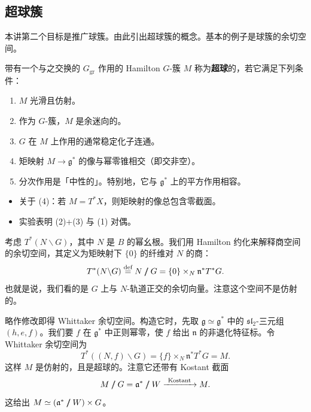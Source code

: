 \subsection{超球簇}

本讲第二个目标是推广球簇。由此引出超球簇的概念。基本的例子是球簇的余切空间。

\begin{defn}
带有一个与之交换的 $G_{\mathrm{gr}}$ 作用的 Hamilton $G$-簇 $M$ 称为\textbf{超球}的，若它满足下列条件：
\begin{enumerate}[label=(\arabic*),leftmargin=1.8em,itemsep=0.15em]
  \item $M$ 光滑且仿射。
  \item 作为 $G$-簇，$M$ 是余迷向的。
  \item $G$ 在 $M$ 上作用的通常稳定化子连通。
  \item 矩映射 $M\to\mathfrak g^*$ 的像与幂零锥相交（即交非空）。
  \item 分次作用是「中性的」。特别地，它与 $\mathfrak g^*$ 上的平方作用相容。
\end{enumerate}
\end{defn}

\begin{rem}\leavevmode\par
\begin{itemize}[leftmargin=1.4em]
  \item 关于 (4)：若 $M=T^*X$，则矩映射的像总包含零截面。
  \item 实验表明 (2)+(3) 与 (1) 对偶。
\end{itemize}
\end{rem}

\begin{exmp}
[$M$ 不是 $T^*X$ 形状的情形]
考虑 $T^*(N\backslash G)$，其中 $N$ 是 $B$ 的幂幺根。我们用 Hamilton 约化来解释商空间的余切空间，其定义为矩映射下 $\{0\}$ 的纤维对 $N$ 的商：
\[
  T^*(N\backslash G)\overset{\text{def}}{=}N\mathrel{/\mkern-10mu/} G=\{0\}\times_N\mathfrak n^*T^*G.
\]
也就是说，我们看的是 $G$ 上与 $N$-轨道正交的余切向量。注意这个空间不是仿射的。

略作修改即得 Whittaker 余切空间。构造它时，先取 $\mathfrak g\simeq\mathfrak g^*$ 中的 $\mathfrak{sl}_2$-三元组 $(h,e,f)$。我们要 $f$ 在 $\mathfrak g^*$ 中正则幂零，使 $f$ 给出 $\mathfrak n$ 的非退化特征标。令 Whittaker 余切空间为
\[
  T^*((N,f)\backslash G)=\{f\}\times_N\mathfrak n^*T^*G=M.
\]
这样 $M$ 是仿射的，且是超球的。注意它还带有 Kostant 截面
\[
  M\gquot G=\mathfrak a^*\gquot W\xrightarrow{\ \text{Kostant}\ }M.
\]
这给出 $M\simeq(\mathfrak a^*\mathrel{/\mkern-10mu/} W)\times G$。
\end{exmp}

